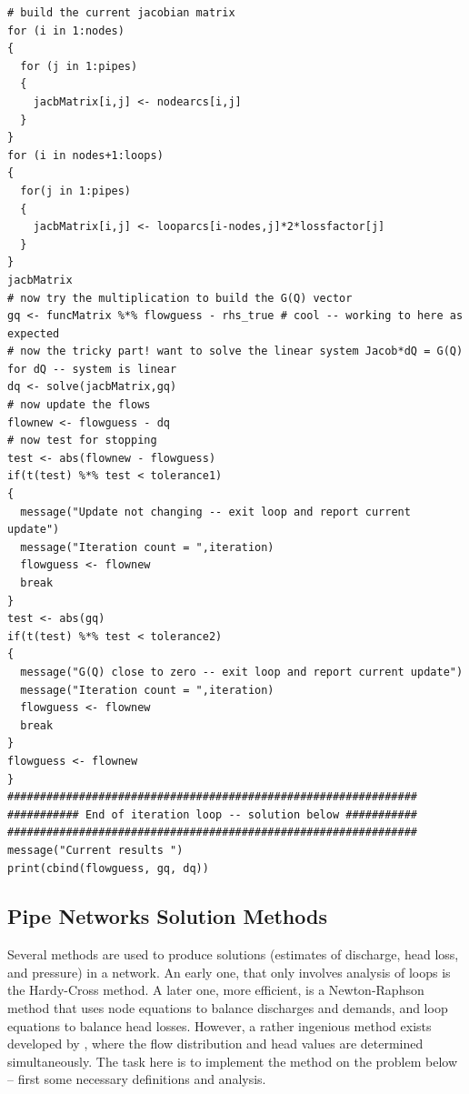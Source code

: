 \begin{lstlisting}[caption=R code demonstrating a Pipeline Network Simulator \\ This fragment of code contains the computations that are used to build the Jacobian matrix, label=lst:PipeNetwork4]
# build the current jacobian matrix
for (i in 1:nodes)
{
  for (j in 1:pipes)
  {
    jacbMatrix[i,j] <- nodearcs[i,j]
  }
}
for (i in nodes+1:loops)
{
  for(j in 1:pipes)
  {
    jacbMatrix[i,j] <- looparcs[i-nodes,j]*2*lossfactor[j]
  }
}
jacbMatrix
# now try the multiplication to build the G(Q) vector
gq <- funcMatrix %*% flowguess - rhs_true # cool -- working to here as expected
# now the tricky part! want to solve the linear system Jacob*dQ = G(Q) for dQ -- system is linear
dq <- solve(jacbMatrix,gq)
# now update the flows
flownew <- flowguess - dq
# now test for stopping
test <- abs(flownew - flowguess)
if(t(test) %*% test < tolerance1)
{
  message("Update not changing -- exit loop and report current update")
  message("Iteration count = ",iteration)
  flowguess <- flownew
  break
}
test <- abs(gq)
if(t(test) %*% test < tolerance2)
{
  message("G(Q) close to zero -- exit loop and report current update")
  message("Iteration count = ",iteration)
  flowguess <- flownew
  break
}
flowguess <- flownew
}
###############################################################
########### End of iteration loop -- solution below ###########
###############################################################
message("Current results ")
print(cbind(flowguess, gq, dq))
\end{lstlisting}   



\subsection{Pipe Networks Solution Methods}
Several methods are used to produce solutions (estimates of discharge, head loss, and pressure) in a network.  
An early one, that only involves analysis of loops is the Hardy-Cross method.  
A later one, more efficient, is a Newton-Raphson method that uses node equations to balance discharges and demands, and loop equations to balance head losses.  
However, a rather ingenious method exists developed by \cite{Haman1971}, where the flow distribution and head values are determined simultaneously.   The task here is to implement the \cite{Haman1971} method on the problem below -- first some necessary definitions and analysis.

